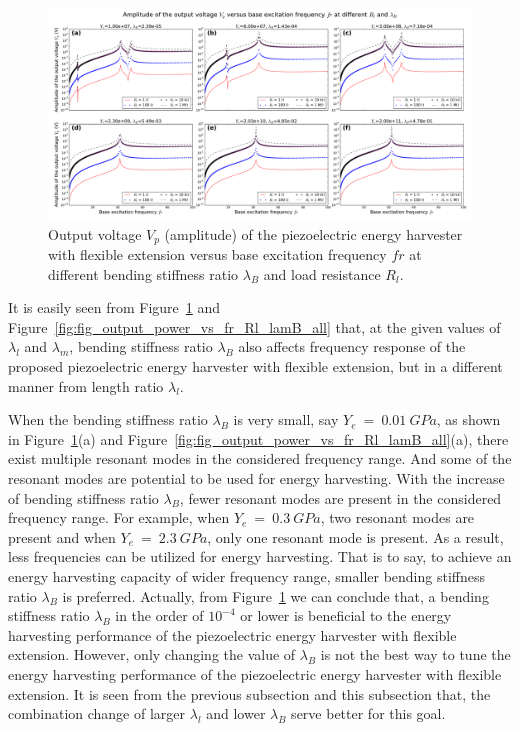 \documentclass{elsarticle}
\begin{document}
\begin{figure}[!htbp]
    \centering
    \includegraphics[width=\textwidth]{./fig_output_voltage_vs_fr_Rl_lamB_all}
    \caption{Output voltage $V_p$ (amplitude) of the piezoelectric energy harvester with flexible extension versus base excitation frequency $fr$ at different bending stiffness ratio $\lambda_B$ and load resistance $R_l$. \color{red}{to be revised in the legend. change figure title} }
    \label{fig:fig_output_voltage_vs_fr_Rl_lamB_all}
\end{figure}

It is easily seen from Figure~\ref{fig:fig_output_voltage_vs_fr_Rl_lamB_all} and Figure~\ref{fig:fig_output_power_vs_fr_Rl_lamB_all} that, at the given values of $\lambda_l$ and $\lambda_m$, bending stiffness ratio $\lambda_B$ also affects frequency response of the proposed piezoelectric energy harvester with flexible extension, but in a different manner from length ratio $\lambda_l$. 

When the bending stiffness ratio $\lambda_B$ is very small, say $Y_e\ =\ 0.01\ GPa$, as shown in Figure~\ref{fig:fig_output_voltage_vs_fr_Rl_lamB_all}(a) and Figure~\ref{fig:fig_output_power_vs_fr_Rl_lamB_all}(a), there exist multiple resonant modes in the considered frequency range. And some of the resonant modes are potential to be used for energy harvesting. With the increase of bending stiffness ratio $\lambda_B$, fewer resonant modes are present in the considered frequency range. For example, when $Y_e\ =\ 0.3\ GPa$, two resonant modes are present and when $Y_e\ =\ 2.3\ GPa$, only one resonant mode is present. As a result, less frequencies can be utilized for energy harvesting. That is to say, to achieve an energy harvesting capacity of wider frequency range, smaller bending stiffness ratio $\lambda_B$ is preferred. Actually, from Figure~\ref{fig:fig_output_voltage_vs_fr_Rl_lamB_all} we can conclude that, a bending stiffness ratio $\lambda_B$ in the order of $10^{-4}$ or lower is beneficial to the energy harvesting performance of the piezoelectric energy harvester with flexible extension. However, only changing the value of $\lambda_B$ is not the best way to tune the energy harvesting performance of the piezoelectric energy harvester with flexible extension. It is seen from the previous subsection and this subsection that, the combination change of larger $\lambda_l$ and lower $\lambda_B$ serve better for this goal.
\end{document}
